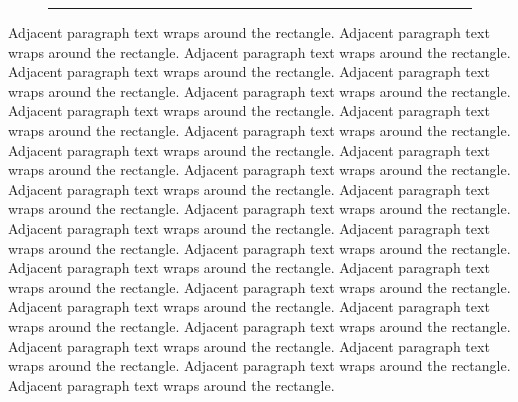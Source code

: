 \documentclass{article}\usepackage[margin=25mm]{geometry}\usepackage{wrapfig}
\begin{document}
\begin{figure}\rule{20mm}{12mm}\end{figure}
Adjacent paragraph text wraps around the rectangle. Adjacent paragraph text wraps around the rectangle. Adjacent paragraph text wraps around the rectangle. Adjacent paragraph text wraps around the rectangle. Adjacent paragraph text wraps around the rectangle. Adjacent paragraph text wraps around the rectangle. Adjacent paragraph text wraps around the rectangle. Adjacent paragraph text wraps around the rectangle. Adjacent paragraph text wraps around the rectangle. Adjacent paragraph text wraps around the rectangle. Adjacent paragraph text wraps around the rectangle. Adjacent paragraph text wraps around the rectangle. Adjacent paragraph text wraps around the rectangle. Adjacent paragraph text wraps around the rectangle. Adjacent paragraph text wraps around the rectangle. Adjacent paragraph text wraps around the rectangle. Adjacent paragraph text wraps around the rectangle. Adjacent paragraph text wraps around the rectangle. Adjacent paragraph text wraps around the rectangle. Adjacent paragraph text wraps around the rectangle. Adjacent paragraph text wraps around the rectangle. Adjacent paragraph text wraps around the rectangle. Adjacent paragraph text wraps around the rectangle. Adjacent paragraph text wraps around the rectangle. Adjacent paragraph text wraps around the rectangle. Adjacent paragraph text wraps around the rectangle. Adjacent paragraph text wraps around the rectangle. Adjacent paragraph text wraps around the rectangle. 
\end{document}
